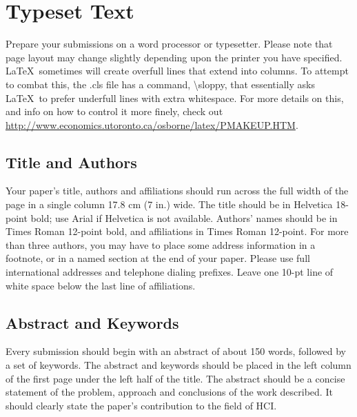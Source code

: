 \section{Typeset Text}

Prepare your submissions on a word processor or typesetter.  Please
                                note that page layout may change slightly depending upon the printer
                                you have specified.  \LaTeX\ sometimes will create overfull lines
                                that extend into columns.  To attempt to combat this, the .cls
                                file has a command, {\textbackslash}sloppy, that essentially asks
                                \LaTeX\ to prefer underfull lines with extra whitespace.  For more
                                details on this, and info on how to control it more finely, check out
                                {\url{http://www.economics.utoronto.ca/osborne/latex/PMAKEUP.HTM}}.

\subsection{Title and Authors}

Your paper's title, authors and affiliations should run across the
                                full width of the page in a single column 17.8 cm (7 in.) wide.  The
                                title should be in Helvetica 18-point bold; use Arial if Helvetica is
                                not available.  Authors' names should be in Times Roman 12-point bold,
                                and affiliations in Times Roman 12-point.  For more than three authors,
                                you may have to place some address information in a footnote, or in a named
                                section at the end of your paper. Please use full international addresses and
                                telephone dialing prefixes.  Leave one 10-pt line of white space below the last
                                line of affiliations.

\subsection{Abstract and Keywords}

Every submission should begin with an abstract of about 150 words,
                                followed by a set of keywords. The abstract and keywords should be
                                placed in the left column of the first page under the left half of the
                                title. The abstract should be a concise statement of the problem,
                                approach and conclusions of the work described.  It should clearly
                                state the paper's contribution to the field of HCI.

